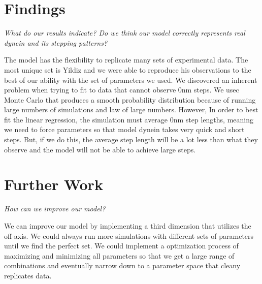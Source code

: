 \section{Findings}
\textit{What do our results indicate? Do we think our model correctly represents real dynein and its stepping patterns?}

The model has the flexibility to replicate many sets of experimental data. The most unique set is Yildiz and we were able to reproduce his observations to the best of our ability with the set of parameters we used. We discovered an inherent problem when trying to fit to data that cannot observe 0nm steps. We usec Monte Carlo that produces a smooth probability distribution because of running large numbers of simulations and law of large numbers. However, In order to best fit the linear regression, the simulation must average 0nm step lengths, meaning we need to force parameters so that model dynein takes very quick and short steps. But, if we do this, the average step length will be a lot less than what they observe and the model will not be able to achieve large steps. 



\section{Further Work}
\textit{How can we improve our model?}

We can improve our model by implementing a third dimension that utilizes the off-axis. We could always run more simulations with different sets of parameters until we find the perfect set. We could implement a optimization process of maximizing and minimizing all parameters so that we get a large range of combinations and eventually narrow down to a parameter space that cleany replicates data. 